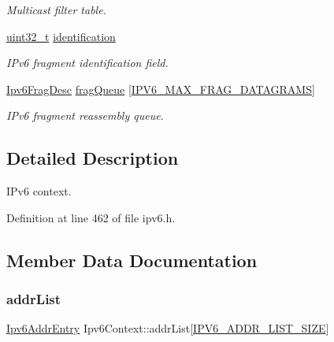 \begin{DoxyCompactItemize}
\begin{DoxyCompactList}\small\item\em Multicast filter table. \end{DoxyCompactList}\item 
\hyperlink{stdint_8h_a435d1572bf3f880d55459d9805097f62}{uint32\+\_\+t} \hyperlink{structIpv6Context_ac20009d3548073769826a1f24683dc00}{identification}
\begin{DoxyCompactList}\small\item\em I\+Pv6 fragment identification field. \end{DoxyCompactList}\item 
\hyperlink{structIpv6FragDesc}{Ipv6\+Frag\+Desc} \hyperlink{structIpv6Context_ab6742e4275aba216d1a6d6c4a428646e}{frag\+Queue} \mbox{[}\hyperlink{net__config_8h_a32fb76378a9b006c9aff62f2f40ac143}{I\+P\+V6\+\_\+\+M\+A\+X\+\_\+\+F\+R\+A\+G\+\_\+\+D\+A\+T\+A\+G\+R\+A\+MS}\mbox{]}
\begin{DoxyCompactList}\small\item\em I\+Pv6 fragment reassembly queue. \end{DoxyCompactList}\end{DoxyCompactItemize}


\subsection{Detailed Description}
I\+Pv6 context. 

Definition at line 462 of file ipv6.\+h.



\subsection{Member Data Documentation}
\mbox{\label{structIpv6Context_ac5e6fa6ff4474f9c4cbde174b60d497d}} 
\subsubsection{\texorpdfstring{addr\+List}{addrList}}
{\footnotesize\ttfamily \hyperlink{structIpv6AddrEntry}{Ipv6\+Addr\+Entry} Ipv6\+Context\+::addr\+List\mbox{[}\hyperlink{ipv6_8h_aa9064306086cc3bba39cf75db3ec2881}{I\+P\+V6\+\_\+\+A\+D\+D\+R\+\_\+\+L\+I\+S\+T\+\_\+\+S\+I\+ZE}\mbox{]}}



